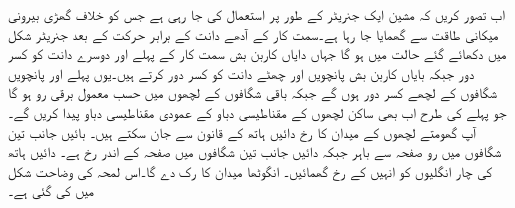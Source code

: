 اب  تصور کریں کہ مشین ایک جنریٹر کے طور پر استعمال کی جا رہی ہے جس کو خلاف  گھڑی  بیرونی میکانی طاقت سے گھمایا جا رہا ہے۔سمت کار کے آدھے دانت کے برابر حرکت  کے بعد جنریٹر  شکل  میں دکھائے گئے حالت میں ہو گا جہاں  دایاں کاربن بش سمت کار کے پہلے اور دوسرے دانت کو کسر دور جبکہ بایاں کاربن بش  پانچویں اور چھٹے دانت کو کسر دور کرتے ہیں۔یوں پہلے اور پانچویں شگافوں کے لچھے کسر دور ہوں گے جبکہ باقی شگافوں کے لچھوں میں حسب معمول برقی رو ہو گا جو پہلے کی طرح اب بھی ساکن لچھوں کے مقناطیسی دباو کے عمودی  مقناطیسی دباو پیدا کریں گے۔آپ گھومتے لچھوں کے میدان کا رخ دائیں ہاتھ کے قانون سے جان سکتے ہیں۔ بائیں جانب تین شگافوں میں رو صفحہ سے باہر جبکہ دائیں جانب تین شگافوں میں صفحہ کے اندر رخ ہے۔ دائیں ہاتھ کی چار انگلیوں کو انہیں کے رخ گھمائیں۔ انگوٹھا میدان کا رک دے گا۔اس لمحہ کی وضاحت شکل   میں کی گئی ہے۔
